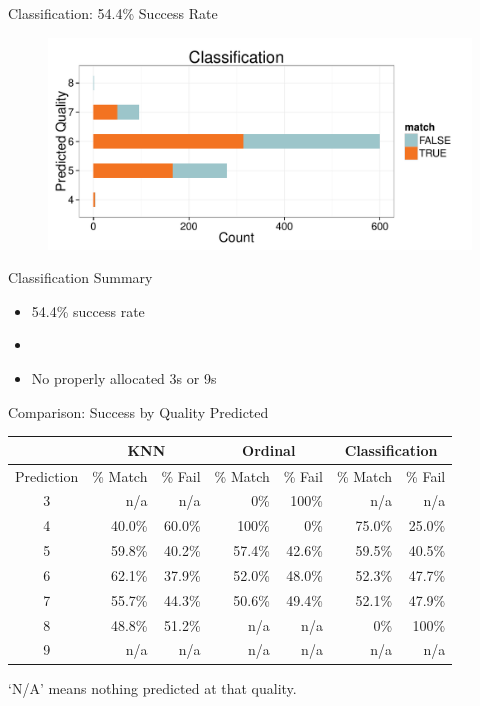 \documentclass{beamer}
\begin{document}
\begin{frame}{Classification: 54.4\% Success Rate}
	\begin{figure}
		\centering
		\includegraphics[width=\textwidth]{../images/Classification_Results.pdf}
	\end{figure}
\end{frame}

\begin{frame}{Classification Summary}
	\begin{itemize}
	\item 54.4\% success rate
	\item[]
	\item No properly allocated 3s or 9s
	\end{itemize}
\end{frame}

\begin{frame}{Comparison: Success by Quality Predicted}
	\begin{center}
	
	\begin{tabular}{c | r r | r r | r r|}
		           & \multicolumn{2}{c|}{KNN} & \multicolumn{2}{c|}{Ordinal} & \multicolumn{2}{c|}{Classification}          \\ \hline
		Prediction & \% Match & \% Fail       & \% Match & \% Fail       & \% Match & \% Fail       \\ \hline
		    3      & n/a      & n/a           & 0\%      & 100\%         & n/a      & n/a           \\
		    4      & 40.0\%   & 60.0\%        & 100\%    & 0\%           & 75.0\%   & 25.0\%        \\
		    5      & 59.8\%   & 40.2\%        & 57.4\%   & 42.6\%        & 59.5\%   & 40.5\%        \\
		    6      & 62.1\%   & 37.9\%        & 52.0\%   & 48.0\%        & 52.3\%   & 47.7\%        \\
		    7      & 55.7\%   & 44.3\%        & 50.6\%   & 49.4\%        & 52.1\%   & 47.9\%        \\
		    8      & 48.8\%   & 51.2\%        & n/a      & n/a           & 0\%      & 100\%         \\
		    9      & n/a      & n/a           & n/a      & n/a           & n/a      & n/a           \end{tabular}
	
	\end{center}
	`N/A' means nothing predicted at that quality.
\end{frame}
\end{document}
